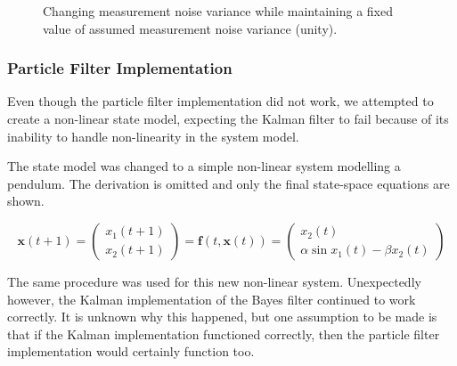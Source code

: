 \begin{figure}[h]
\centering
{}
\caption{Changing measurement noise variance while maintaining a fixed value
of assumed measurement noise variance (unity).}
\label{fig:noise-error}
\end{figure}

\subsubsection{Particle Filter Implementation}
Even though the particle filter implementation did not work, we attempted to
create a non-linear state model, expecting the Kalman filter to fail because
of its inability to handle non-linearity in the system model.

The state model was changed to a simple non-linear system modelling a pendulum.
The derivation is omitted and only the final state-space equations are shown.

\begin{equation}
\mathbf{x}(t+1) =
\begin{pmatrix}
x_{1}(t+1) \\ x_{2}(t+1)
\end{pmatrix}
=
\mathbf{f}(t, \mathbf{x}(t)) =
\begin{pmatrix}
x_{2}(t) \\ \alpha \sin x_{1}(t) - \beta x_{2}(t)
\end{pmatrix}
\end{equation}

The same procedure was used for this new non-linear system. Unexpectedly however,
the Kalman implementation of the Bayes filter continued to work correctly.
It is unknown why this happened, but one assumption to be made is that if the
Kalman implementation functioned correctly, then the particle filter implementation
would certainly function too.

